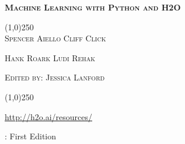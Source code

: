 %








\thispagestyle{empty} %


\begin{center}
\textsc{\Large\bf{Machine Learning with Python and H2O}}

\bigskip
\line(1,0){250}  %
\\
\bigskip
\small
\textsc{Spencer Aiello \hspace{10pt} Cliff Click  \hspace{10pt} }

\textsc{Hank Roark  \hspace{10pt} Ludi Rehak}

\textsc{Edited by: Jessica Lanford}

\normalsize

\line(1,0){250}  %

{\url{http://h2o.ai/resources/}}

\bigskip

\monthname \hspace{1pt}  \the\year: First Edition 

\bigskip
\end{center}


\newpage
\restoregeometry

\null\vfill %

\thispagestyle{empty}%

